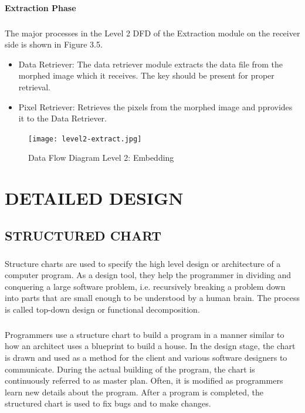 \documentclass[12pt]{report}
\begin{document}
\subsubsection{Extraction Phase}
\paragraph{}The major processes in the Level 2 DFD of the Extraction module on the receiver side is shown in Figure 3.5. 
\begin{itemize}
\item Data Retriever: The data retriever module extracts the data file from the morphed image which it receives. The key should be present for proper retrieval.
\item Pixel Retriever: Retrieves the pixels from the morphed image and pprovides it to the Data Retriever.
\end{itemize}
\begin{figure}[h!]
	\centering
		\texttt{[image: level2-extract.jpg]}
		\caption{Data Flow Diagram Level 2: Embedding}
\end{figure}
\pagebreak

\chapter{DETAILED DESIGN}
\pagestyle{fancy}
\chead{}
\rfoot{\small{\thepage}}
\renewcommand{\headrulewidth}{0.4pt}
\renewcommand{\footrulewidth}{0.4pt}
\section{STRUCTURED CHART}
\paragraph{}Structure charts are used to specify the high level design or architecture of a computer program. As a design tool, they help the programmer in dividing and conquering a large software problem, i.e. recursively breaking a problem down into parts that are small enough to be understood by a human brain. The process is called top-down design or functional decomposition. 
\paragraph{}Programmers use a structure chart to build a program in a manner similar to how an architect uses a blueprint to build a house. In the design stage, the chart is drawn and used as a method for the client and various software designers to communicate. During the actual building of the program, the chart is continuously referred to as master plan. Often, it is modified as programmers learn new details about the program. After a program is completed, the structured chart is used to fix bugs and to make changes.
\end{document}
